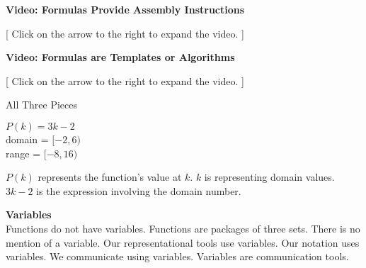 \documentclass{ximera}
\begin{document}
\begin{explanation} \textbf{Video: Formulas Provide Assembly Instructions}

[ Click on the arrow to the right to expand the video. ]
\begin{expandable} 

\begin{center}
\end{center}

\end{expandable}
\end{explanation}




\begin{explanation} \textbf{Video: Formulas are Templates or Algorithms}

[ Click on the arrow to the right to expand the video. ]
\begin{expandable} 

\begin{center}
\end{center}

\end{expandable}
\end{explanation}








\begin{example}   All Three Pieces 

$P(k) = 3k - 2$ \\
domain = $[-2, 6)$ \\
range = $[-8, 16)$


$P(k)$ represents the function's value at $k$.  $k$ is representing domain values. $3k - 2$ is the expression involving the domain number.

\end{example}




\begin{warning} \textbf{\textcolor{red!90!darkgray}{Variables}}    \\

Functions do not have variables.  Functions are packages of three sets.  There is no mention of a variable. Our representational tools use variables. Our notation uses variables. We communicate using variables.  Variables are communication tools. 

\end{warning}
\end{document}
